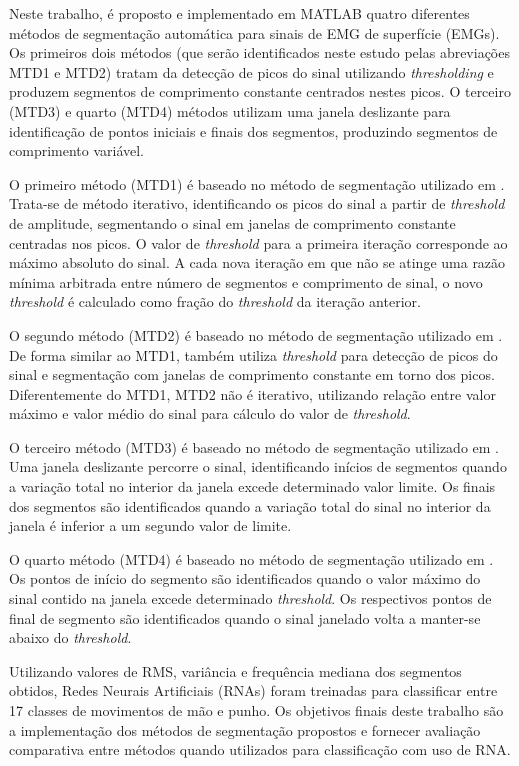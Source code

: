 Neste trabalho, é proposto e implementado em MATLAB quatro diferentes métodos de segmentação automática para sinais de EMG de superfície (EMGs). Os primeiros dois métodos (que serão identificados neste estudo pelas abreviações MTD1 e MTD2) tratam da detecção de picos do sinal utilizando \emph{thresholding} e produzem segmentos de comprimento constante centrados nestes picos. O terceiro (MTD3) e quarto (MTD4) métodos utilizam uma janela deslizante para identificação de pontos iniciais e finais dos segmentos, produzindo segmentos de comprimento variável.

O primeiro método (MTD1) é baseado no método de segmentação utilizado em . Trata-se de método iterativo, identificando os picos do sinal a partir de \emph{threshold} de amplitude, segmentando o sinal em janelas de comprimento constante centradas nos picos. O valor de \emph{threshold} para a primeira iteração corresponde ao máximo absoluto do sinal. A cada nova iteração em que não se atinge uma razão mínima arbitrada entre número de segmentos e comprimento de sinal, o novo \emph{threshold} é calculado como fração do \emph{threshold} da iteração anterior.

O segundo método (MTD2) é baseado no método de segmentação utilizado em . De forma similar ao MTD1, também utiliza \emph{threshold} para detecção de picos do sinal e segmentação com janelas de comprimento constante em torno dos picos. Diferentemente do MTD1, MTD2 não é iterativo, utilizando relação entre valor máximo e valor médio do sinal para cálculo do valor de \emph{threshold}.

O terceiro método (MTD3) é baseado no método de segmentação utilizado em . Uma janela deslizante percorre o sinal, identificando inícios de segmentos quando a variação total no interior da janela excede determinado valor limite. Os finais dos segmentos são identificados quando a variação total do sinal no interior da janela é inferior a um segundo valor de limite.

O quarto método (MTD4) é baseado no método de segmentação utilizado em . Os pontos de início do segmento são identificados quando o valor máximo do sinal contido na janela excede determinado \emph{threshold}. Os respectivos pontos de final de segmento são identificados quando o sinal janelado volta a manter-se abaixo do \emph{threshold}.

Utilizando valores de RMS, variância e frequência mediana dos segmentos obtidos, Redes Neurais Artificiais (RNAs) foram treinadas para classificar entre 17 classes de movimentos de mão e punho. Os objetivos finais deste trabalho são a implementação dos métodos de segmentação propostos e fornecer avaliação comparativa entre métodos quando utilizados para classificação com uso de RNA.

